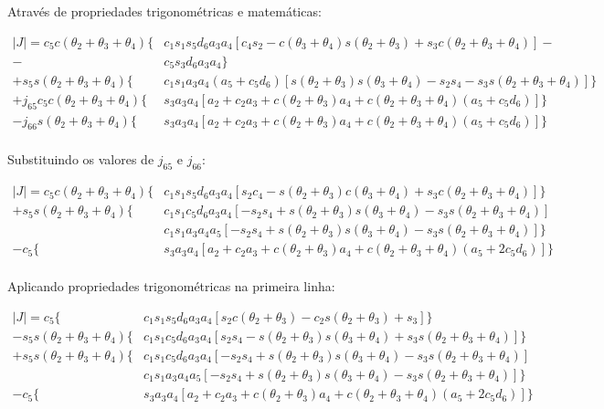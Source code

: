 Através de propriedades trigonométricas e matemáticas:

\begin{align*}
    |J| = c_5c(\theta_2+\theta_3+\theta_4)\{&c_1s_1s_5d_6a_3a_4[c_4s_2-c(\theta_3+\theta_4)s(\theta_2+\theta_3)+s_3c(\theta_2+\theta_3+\theta_4)]-\\
                                          -&c_5s_3d_6a_3a_4\}\\
         +s_5s(\theta_2+\theta_3+\theta_4)\{&c_1s_1a_3a_4(a_5+c_5d_6)[s(\theta_2+\theta_3)s(\theta_3+\theta_4)-s_2s_4-s_3s(\theta_2+\theta_3+\theta_4)]\} \\
    +j_{65}c_5c(\theta_2+\theta_3+\theta_4)\{&s_3a_3a_4[a_2+c_2a_3+c(\theta_2+\theta_3)a_4+c(\theta_2+\theta_3+\theta_4)(a_5+c_5d_6)]\} \\
       -j_{66}s(\theta_2+\theta_3+\theta_4)\{&s_3a_3a_4[a_2+c_2a_3+c(\theta_2+\theta_3)a_4+c(\theta_2+\theta_3+\theta_4)(a_5+c_5d_6)]\} \\          
\end{align*}

Substituindo os valores de $j_{65}$ e $j_{66}$:

\begin{align*}
    |J| =  c_5c(\theta_2+\theta_3+\theta_4)\{&c_1s_1s_5d_6a_3a_4[s_2c_4-s(\theta_2+\theta_3)c(\theta_3+\theta_4)+s_3c(\theta_2+\theta_3+\theta_4)]\}\\
          +s_5s(\theta_2+\theta_3+\theta_4)\{&c_1s_1c_5d_6a_3a_4[-s_2s_4+s(\theta_2+\theta_3)s(\theta_3+\theta_4)-s_3s(\theta_2+\theta_3+\theta_4)] \\
                                             &c_1s_1a_3a_4a_5[-s_2s_4+s(\theta_2+\theta_3)s(\theta_3+\theta_4)-s_3s(\theta_2+\theta_3+\theta_4)]\} \\
                                       -c_5\{&s_3a_3a_4[a_2+c_2a_3+c(\theta_2+\theta_3)a_4+c(\theta_2+\theta_3+\theta_4)(a_5+2c_5d_6)]\} \\       
\end{align*}

Aplicando propriedades trigonométricas na primeira linha:

\begin{align*}
    |J| =                               c_5\{&c_1s_1s_5d_6a_3a_4[s_2c(\theta_2+\theta_3)-c_2s(\theta_2+\theta_3)+s_3]\} \\
          -s_5s(\theta_2+\theta_3+\theta_4)\{&c_1s_1c_5d_6a_3a_4[s_2s_4-s(\theta_2+\theta_3)s(\theta_3+\theta_4)+s_3s(\theta_2+\theta_3+\theta_4)]\}\\
          +s_5s(\theta_2+\theta_3+\theta_4)\{&c_1s_1c_5d_6a_3a_4[-s_2s_4+s(\theta_2+\theta_3)s(\theta_3+\theta_4)-s_3s(\theta_2+\theta_3+\theta_4)] \\
                                             &c_1s_1a_3a_4a_5[-s_2s_4+s(\theta_2+\theta_3)s(\theta_3+\theta_4)-s_3s(\theta_2+\theta_3+\theta_4)]\} \\
                                       -c_5\{&s_3a_3a_4[a_2+c_2a_3+c(\theta_2+\theta_3)a_4+c(\theta_2+\theta_3+\theta_4)(a_5+2c_5d_6)]\} \\       
\end{align*}

